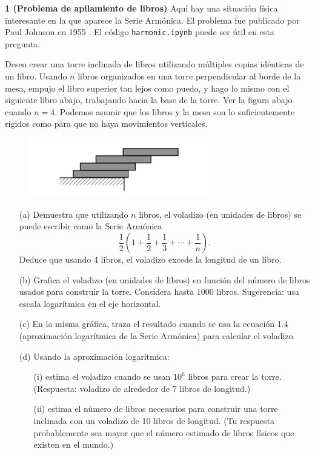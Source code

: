 \documentclass{article}
\begin{document}
\textbf{1 (Problema de apilamiento de libros)} Aquí hay una situación física interesante en la que aparece la Serie Armónica. El problema fue publicado por Paul Johnson en 1955 \cite{101}. El código \texttt{harmonic.ipynb} puede ser útil en esta pregunta.

Deseo crear una torre inclinada de libros utilizando múltiples copias idénticas de un libro. Usando \(n\) libros organizados en una torre perpendicular al borde de la mesa, empujo el libro superior tan lejos como puedo, y hago lo mismo con el siguiente libro abajo, trabajando hacia la base de la torre. Ver la figura abajo cuando \(n = 4\). Podemos asumir que los libros y la mesa son lo suficientemente rígidos como para que no haya movimientos verticales.

\begin{figure}[h]
    \centering
    \includegraphics[width=0.7\textwidth]{pictures/block.png}
    \label{fig:1img}
\end{figure}

\begin{itemize}
    \item[(a)] Demuestra que utilizando \(n\) libros, el voladizo (en unidades de libros) se puede escribir como la Serie Armónica
    \[
    \frac{1}{2} \left(1 + \frac{1}{2} + \frac{1}{3} + \cdots + \frac{1}{n}\right).
    \]
    Deduce que usando 4 libros, el voladizo excede la longitud de un libro.
    
    \item[(b)] Grafica el voladizo (en unidades de libros) en función del número de libros usados para construir la torre. Considera hasta 1000 libros. Sugerencia: usa escala logarítmica en el eje horizontal.
    
    \item[(c)] En la misma gráfica, traza el resultado cuando se usa la ecuación 1.4 (aproximación logarítmica de la Serie Armónica) para calcular el voladizo.
    
    \item[(d)] Usando la aproximación logarítmica:
    \begin{itemize}
        \item[(i)] estima el voladizo cuando se usan \(10^6\) libros para crear la torre. (Respuesta: voladizo de alrededor de 7 libros de longitud.)
        
        \item[(ii)] estima el número de libros necesarios para construir una torre inclinada con un voladizo de 10 libros de longitud. (Tu respuesta probablemente sea mayor que el número estimado de libros físicos que existen en el mundo.)
    \end{itemize}
\end{itemize}
\end{document}
